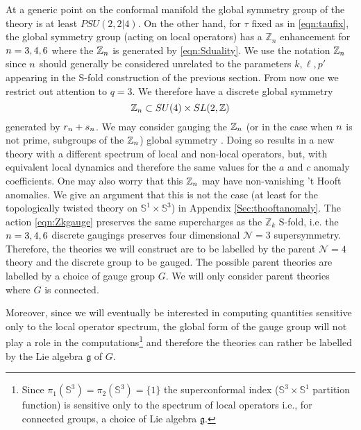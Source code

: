 \documentclass[main.tex]{subfiles}
\begin{document}
At a generic point on the conformal manifold the global symmetry group of the theory is at least $PSU(2,2|4)$. On the other hand, for $\tau$ fixed as in \eqref{eqn:taufix}, the global symmetry group (acting on local operators) has a $\mathbb{Z}_n$  enhancement for ${n}=3,4,6$ where the $\mathbb{Z}_{n}$ is generated by \eqref{eqn:Sduality}. We use the notation $\mathbb{Z}_{n}$ since
${n}$ should generally be considered unrelated to the parameters $k,\ell,p'$ appearing in the S-fold construction of the previous section. From now one we restrict out attention to $q=3$. We therefore have a discrete global symmetry
\begin{equation}\label{eqn:Zkgauge}
\mathbb{Z}_{n}\subset SU(4)\times SL(2,\mathbb{Z})
\end{equation}
generated by $r_{n}+ s_{n}$. We may consider gauging the $\mathbb{Z}_{n}$ (or in the case when ${n}$ is not prime, subgroups of the $\mathbb{Z}_{n}$) global symmetry \cite{Argyres:2016yzz}. Doing so results in a new theory with a different spectrum of local and non-local operators, but, with equivalent local dynamics and therefore the same values for the $a$ and $c$ anomaly coefficients. One may also worry that this $\mathbb{Z}_{n}$ may have non-vanishing 't Hooft anomalies. We give an argument that this is not the case (at least for the topologically twisted theory on $\mathbb{S}^1\times \mathbb{S}^3$) in Appendix \ref{Sec:thooftanomaly}. 
The action \eqref{eqn:Zkgauge} preserves the same supercharges as the $\mathbb{Z}_k$ S-fold, i.e. the ${n}=3,4,6$ discrete gaugings preserves four dimensional $\mathcal{N}=3$ supersymmetry.
Therefore, the theories we will construct are to be labelled by the parent $\mathcal{N}=4$ theory and the discrete group to be gauged. The possible parent theories are labelled by a choice of gauge group $G$. We will only consider parent theories where $G$ is connected. 

Moreover, since we will eventually be interested in computing quantities sensitive only to the local operator spectrum, the global form of the gauge group will not play a role in the computations\footnote{Since $\pi_1\left(\mathbb{S}^3\right)=\pi_2\left(\mathbb{S}^3\right)=\{1\}$ the superconformal index ($\mathbb{S}^3\times\mathbb{S}^1$ partition function) is sensitive only to the spectrum of local operators i.e., for connected groups, a choice of Lie algebra $\mathfrak{g}$.} and therefore the theories can rather be labelled by the Lie algebra $\mathfrak{g}$ of $G$. 
\end{document}
